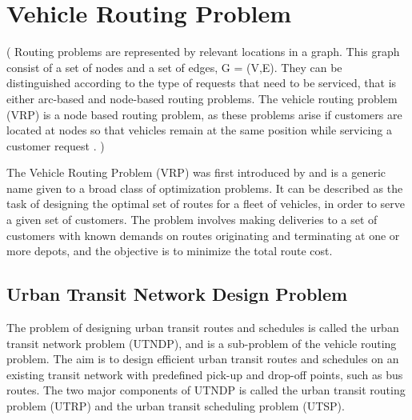 \section{Vehicle Routing Problem }
( Routing problems are represented by relevant locations in a graph. This graph consist of a set of nodes and a set of edges,  G = (V,E). They can be distinguished according to the type of requests that need to be serviced, that is either arc-based and node-based routing problems. The vehicle routing problem (VRP) is a node based routing problem, as these problems arise if customers are located at nodes so that vehicles remain at the same position while servicing a customer request \citep{vehiclerouting}. ) 

The Vehicle Routing Problem (VRP) was first introduced by \citet{dantzig59} and is a generic name given to a broad class of optimization problems. It can be described as the task of designing the optimal set of routes for a fleet of vehicles, in order to serve a given set of customers. The problem involves making deliveries to a set of customers with known demands on routes originating and terminating at one or more depots, and the objective is to minimize the total route cost. 

\subsection{Urban Transit Network Design Problem}

The problem of designing urban transit routes and schedules is called the urban transit network problem (UTNDP), and is a sub-problem of the vehicle routing problem. The aim is to design efficient urban transit routes and schedules on an existing transit network with predefined pick-up and drop-off points, such as bus routes. The two major components of UTNDP is called the urban transit routing problem (UTRP) and the urban transit scheduling problem (UTSP).

